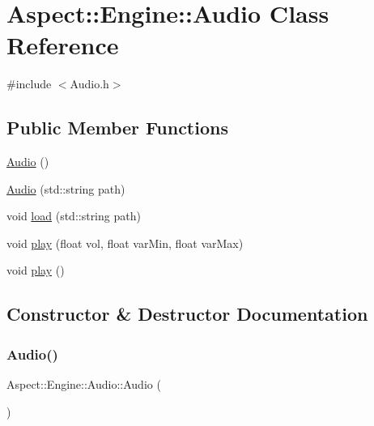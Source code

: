 \hypertarget{class_aspect_1_1_engine_1_1_audio}{}\section{Aspect\+:\+:Engine\+:\+:Audio Class Reference}
\label{class_aspect_1_1_engine_1_1_audio}


{\ttfamily \#include $<$Audio.\+h$>$}

\subsection*{Public Member Functions}
\begin{DoxyCompactItemize}
\item 
\mbox{\hyperlink{class_aspect_1_1_engine_1_1_audio_a83b2274ead49a03b7099f7c3f6e094d7}{Audio}} ()
\item 
\mbox{\hyperlink{class_aspect_1_1_engine_1_1_audio_a10c5fe7f0a1bed3ae07eb4eb695fe82b}{Audio}} (std\+::string path)
\item 
void \mbox{\hyperlink{class_aspect_1_1_engine_1_1_audio_a4371798b0db2bf368dc2526731474798}{load}} (std\+::string path)
\item 
void \mbox{\hyperlink{class_aspect_1_1_engine_1_1_audio_ae0263b513749d07eee8e5596006aba04}{play}} (float vol, float var\+Min, float var\+Max)
\item 
void \mbox{\hyperlink{class_aspect_1_1_engine_1_1_audio_aa5902d97e785ed834b24f2b4fa8abde6}{play}} ()
\end{DoxyCompactItemize}


\subsection{Constructor \& Destructor Documentation}
\mbox{\label{class_aspect_1_1_engine_1_1_audio_a83b2274ead49a03b7099f7c3f6e094d7}} 
\subsubsection{\texorpdfstring{Audio()}{Audio()}\hspace{0.1cm}{\footnotesize\ttfamily [1/2]}}
{\footnotesize\ttfamily Aspect\+::\+Engine\+::\+Audio\+::\+Audio (\begin{DoxyParamCaption}{ }\end{DoxyParamCaption})}

